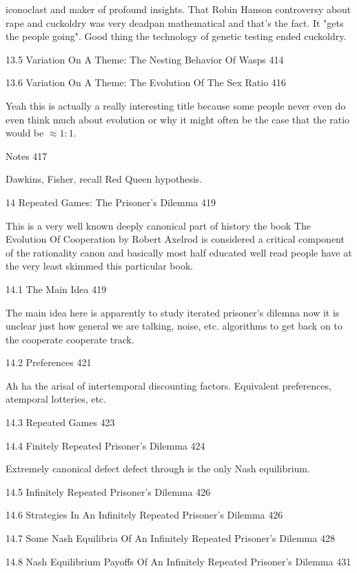 iconoclast and maker of profound insights. That Robin Hanson controversy about rape and cuckoldry was very deadpan mathematical and that's the fact. It "gets the people going". Good thing the technology of genetic testing ended cuckoldry.

13.5 Variation On A Theme: The Nesting Behavior Of Wasps 414



13.6 Variation On A Theme: The Evolution Of The Sex Ratio 416

Yeah this is actually a really interesting title because some people never even do even think much about evolution or why it might often be the case that the ratio would be $\approx 1:1$.

Notes 417

Dawkins, Fisher, recall Red Queen hypothesis.

14 Repeated Games: The Prisoner's Dilemma 419

This is a very well known deeply canonical part of history the book The Evolution Of Cooperation by Robert Axelrod is considered a critical component of the rationality canon and basically most half educated well read people have at the very least skimmed this particular book.

14.1 The Main Idea 419

The main idea here is apparently to study iterated prisoner's dilemna now it is unclear just how general we are talking, noise, etc. algorithms to get back on to the cooperate cooperate track.

14.2 Preferences 421

Ah ha the arisal of intertemporal discounting factors. Equivalent preferences, atemporal lotteries, etc.

14.3 Repeated Games 423



14.4 Finitely Repeated Prisoner's Dilemma 424

Extremely canonical defect defect through is the only Nash equilibrium.

14.5 Infinitely Repeated Prisoner's Dilemma 426



14.6 Strategies In An Infinitely Repeated Prisoner's Dilemma 426



14.7 Some Nash Equilibria Of An Infinitely Repeated Prisoner's Dilemma 428



14.8 Nash Equilibrium Payoffs Of An Infinitely Repeated Prisoner's Dilemma 431



